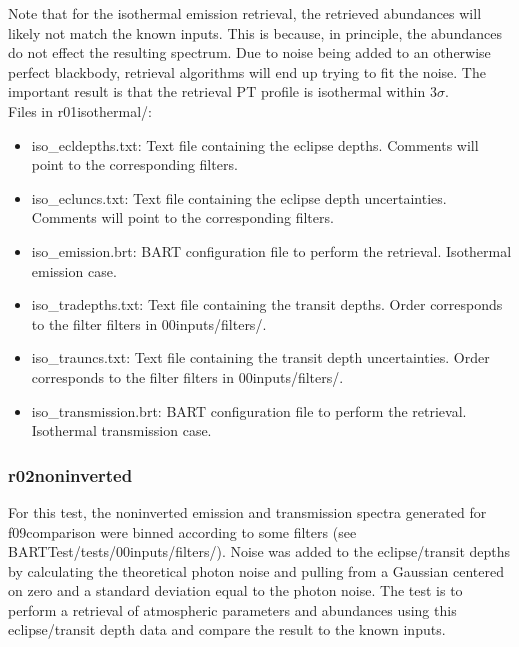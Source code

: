 \documentclass[letterpaper, 12pt]{article}
\begin{document}
Note that for the isothermal emission retrieval, the retrieved abundances will 
likely not match the known inputs. This is because, in principle, the 
abundances do not effect the resulting spectrum. Due to noise being added to 
an otherwise perfect blackbody, retrieval algorithms will end up trying to 
fit the noise. The important result is that the retrieval PT profile is 
isothermal within 3$\sigma$.\\

Files in r01isothermal/:
\begin{itemize} \itemsep0pt
  \item iso{\_}ecldepths.txt: Text file containing the eclipse depths. Comments 
        will point to the corresponding filters.
  \item iso{\_}ecluncs.txt: Text file containing the eclipse depth uncertainties. 
        Comments will point to the corresponding filters.
  \item iso{\_}emission.brt: BART configuration file to perform the retrieval. 
        Isothermal emission case.
  \item iso{\_}tradepths.txt: Text file containing the transit depths. Order 
        corresponds to the filter filters in 00inputs/filters/.
  \item iso{\_}trauncs.txt: Text file containing the transit depth uncertainties. 
        Order corresponds to the filter filters in 00inputs/filters/.
  \item iso{\_}transmission.brt: BART configuration file to perform the 
        retrieval. Isothermal transmission case.
\end{itemize}

\subsubsection{r02noninverted}
For this test, the noninverted emission and transmission spectra generated for 
f09comparison were binned according to some filters (see 
BARTTest/tests/00inputs/filters/). Noise was added to the eclipse/transit 
depths by calculating the theoretical photon noise and pulling from a Gaussian 
centered on zero and a standard deviation equal to the photon noise. The test 
is to perform a retrieval of atmospheric parameters and abundances using this 
eclipse/transit depth data and compare the result to the known inputs.\\
\end{document}
